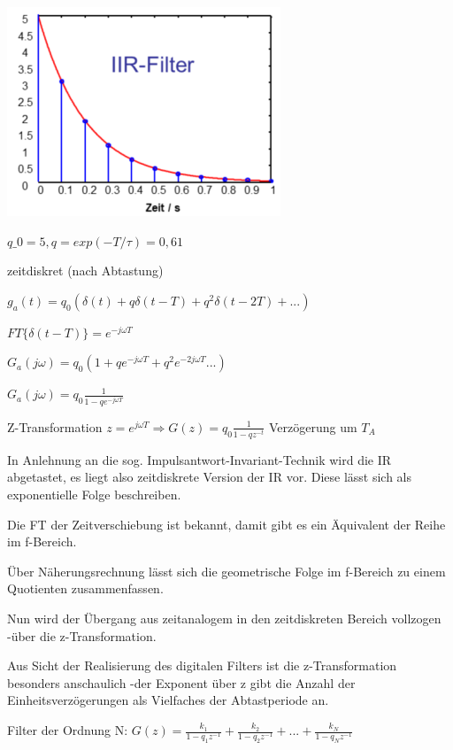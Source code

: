 \documentclass[a4paper]{article}
\begin{document}
\begin{multicols}{3}
  \begin{itemize*}
    \item \includegraphics[width=.5\linewidth]{Assets/Biosignalverarbeitung-iir-3.png}
    \begin{itemize*}
      \item $q\_0=5, q=exp(-T/\tau) = 0,61$
    \end{itemize*}
    \item zeitdiskret (nach Abtastung)
    \begin{itemize*}
      \item $g_a(t)=q_0(\delta(t)+q\delta(t-T)+q^2\delta(t-2T)+...)$
      \item $FT\{\delta(t-T)\}=e^{-j\omega T}$
      \item $G_a(j\omega)=q_0(1+qe^{-j\omega T}+ q^2e^{-2j\omega T}...)$
      \item $G_a(j\omega)=q_0\frac{1}{1-qe^{-j\omega T}}$
      \item Z-Transformation $z=e^{j\omega T} \Rightarrow G(z)=q_0\frac{1}{1-qz^{-t}}$ Verzögerung um $T_A$
    \end{itemize*}
    \item In Anlehnung an die sog. Impulsantwort-Invariant-Technik wird die IR abgetastet, es liegt also zeitdiskrete Version der IR vor. Diese lässt sich als exponentielle Folge beschreiben.
    \item Die FT der Zeitverschiebung ist bekannt, damit gibt es ein Äquivalent der Reihe im f-Bereich.
    \item Über Näherungsrechnung lässt sich die geometrische Folge im f-Bereich zu einem Quotienten zusammenfassen.
    \item Nun wird der Übergang aus zeitanalogem in den zeitdiskreten Bereich vollzogen -über die z-Transformation.
    \item Aus Sicht der Realisierung des digitalen Filters ist die z-Transformation besonders anschaulich -der Exponent über z gibt die Anzahl der Einheitsverzögerungen als Vielfaches der Abtastperiode an.
    \item Filter der Ordnung N: $G(z)=\frac{k_1}{1-q_1z^{-1}}+\frac{k_2}{1-q_2z^{-1}}+...+\frac{k_N}{1-q_Nz^{-1}}$

\end{itemize*}
\end{multicols}
\end{document}
